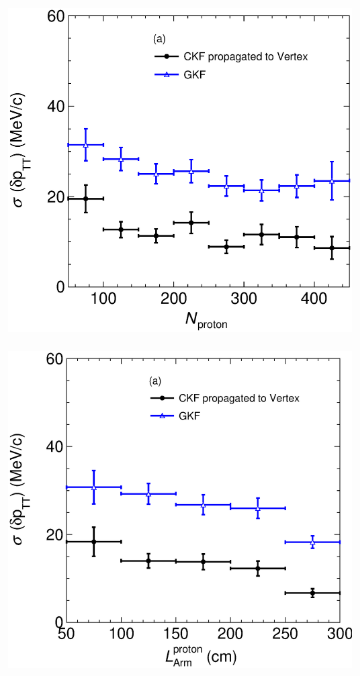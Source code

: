 \begin{figure}[t]
              \begin{subfigure}[b]{0.32\textwidth}
         \centering
         \includegraphics[width=\textwidth]{figures/ch6-TKI/2D/deltapTTVSN2212.eps}
         \caption{}
         \label{fig:deltapTTVSN2212}
     \end{subfigure}
     \begin{subfigure}[b]{0.32\textwidth}
         \centering
         \includegraphics[width=\textwidth]{figures/ch6-TKI/2D/deltapTTVSlArmMC2212.eps}

\end{subfigure}
\end{figure}
